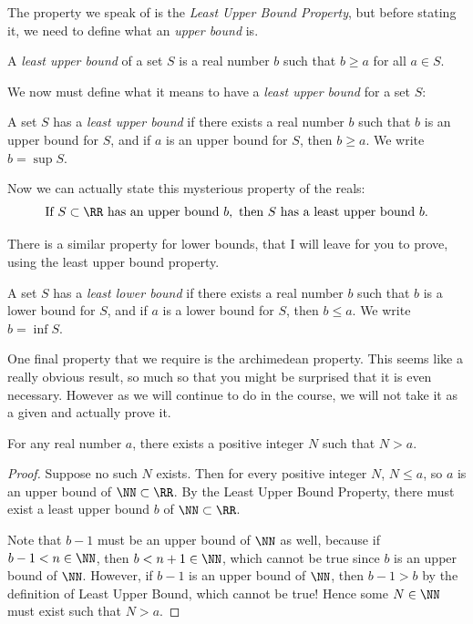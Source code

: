 The property we speak of is the \emph{Least Upper Bound Property}, but before stating it,
we need to define what an \emph{upper bound} is.

\begin{definition}
    A \emph{least upper bound} of a set $S$ is a real number
    $b$ such that $b \geq a$ for all $a \in S$.
\end{definition}

We now must define what it means to have a \emph{least upper bound} for a set $S$:
\begin{definition}
    A set $S$ has a \emph{least upper bound} if there exists a real number $b$ such that
    $b$ is an upper bound for $S$, and if $a$ is an upper bound for $S$, then $b \geq a$. We
    write $b = \sup S$.
\end{definition}

Now we can actually state this mysterious property of the reals:
\[
    \text{If } S \subset \RR \text{ has an upper bound } b, \text{ then } S \text{ has a least upper bound } b.
\]

There is a similar property for lower bounds, that I will leave for you to prove, using
the least upper bound property.
\begin{definition}
    A set $S$ has a \emph{least lower bound} if there exists a real number $b$ such that
    $b$ is a lower bound for $S$, and if $a$ is a lower bound for $S$, then $b \leq a$. We
    write $b = \inf S$.
\end{definition}

One final property that we require is the archimedean property. This seems like a
really obvious result, so much so that you might be surprised that it is even necessary.
However as we will continue to do in the course, we will not take it as a given
and actually prove it.

\begin{theorem}
	For any real number $a$, there exists a positive integer $N$ such that $N > a$.
\end{theorem}

\begin{proof}
	Suppose no such $N$ exists. Then for every positive integer $N$, $N \leq a$,
	so $a$ is an upper bound of $\NN \subset \RR$. By the Least Upper Bound Property,
	there must exist a least upper bound $b$ of $\NN \subset \RR$.

	Note that $b-1$ must be an upper bound of $\NN$ as well, because if $b - 1 < n \in \NN$,
	then $b < n + 1 \in \NN$, which cannot be true since $b$ is an upper bound of $\NN$.
	However, if $b-1$ is an upper bound of $\NN$, then $b - 1 > b$ by the definition
	of Least Upper Bound, which cannot be true! Hence some $N \in \NN$ must exist such that $N > a$.
\end{proof}

